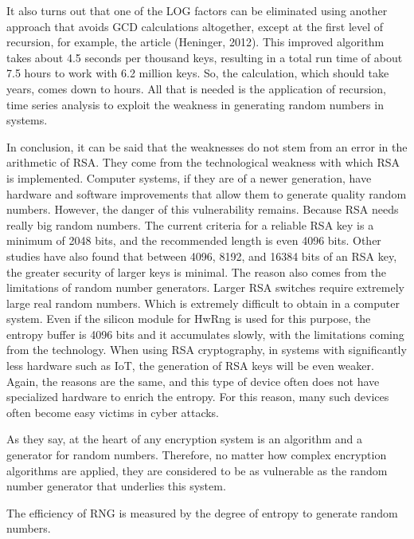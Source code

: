 \documentclass[runningheads]{llncs}
\begin{document}
It also turns out that one of the LOG factors can be eliminated using another approach that avoids GCD calculations altogether, except at the first level of recursion, for example, the article (Heninger, 2012). This improved algorithm takes about 4.5 seconds per thousand keys, resulting in a total run time of about 7.5 hours to work with 6.2 million keys. So, the calculation, which should take years, comes down to hours. All that is needed is the application of recursion, time series analysis to exploit the weakness in generating random numbers in systems.

In conclusion, it can be said that the weaknesses do not stem from an error in the arithmetic of RSA. They come from the technological weakness with which RSA is implemented. Computer systems, if they are of a newer generation, have hardware and software improvements that allow them to generate quality random numbers. However, the danger of this vulnerability remains. Because RSA needs really big random numbers. The current criteria for a reliable RSA key is a minimum of 2048 bits, and the recommended length is even 4096 bits. Other studies have also found that between 4096, 8192, and 16384 bits of an RSA key, the greater security of larger keys is minimal. The reason also comes from the limitations of random number generators. Larger RSA switches require extremely large real random numbers. Which is extremely difficult to obtain in a computer system. Even if the silicon module for HwRng is used for this purpose, the entropy buffer is 4096 bits and it accumulates slowly, with the limitations coming from the technology. When using RSA cryptography, in systems with significantly less hardware such as IoT, the generation of RSA keys will be even weaker. Again, the reasons are the same, and this type of device often does not have specialized hardware to enrich the entropy. For this reason, many such devices often become easy victims in cyber attacks.

As they say, at the heart of any encryption system is an algorithm and a generator for random numbers. Therefore, no matter how complex encryption algorithms are applied, they are considered to be as vulnerable as the random number generator that underlies this system.

The efficiency of RNG is measured by the degree of entropy to generate random numbers.
\end{document}
